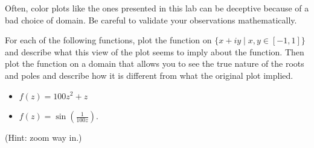 \begin{warn}
Often, color plots like the ones presented in this lab can be deceptive because of a bad choice of domain.
Be careful to validate your observations mathematically.
\end{warn}

\begin{problem}
For each of the following functions, plot the function on $\{x+iy\mid x,y\in[-1,1]\}$ and describe what this view of the plot seems to imply about the function.
Then plot the function on a domain that allows you to see the true nature of the roots and poles and describe how it is different from what the original plot implied.
\begin{itemize}
\item $f(z) = 100z^2 + z$
\item $f(z) = \sin\left(\frac{1}{100z}\right)$.
\end{itemize}
(Hint: zoom way in.)
\end{problem}


